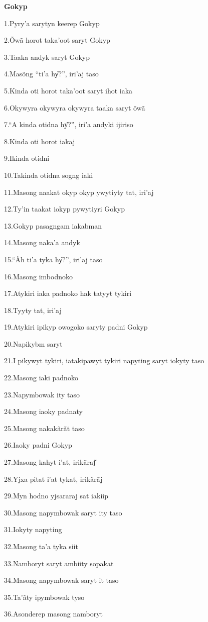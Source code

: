 \textbf{Gokyp}

1.Pyry'a sarytyn keerep Gokyp

2.Õwã horot taka'oot saryt Gokyp

3.Taaka andyk saryt Gokyp

4.Masõng ``ti'a hy͂?'', iri'aj taso

5.Kinda oti horot taka'oot saryt ihot iaka

6.Okywyra okywyra okywyra taaka saryt õwã

7.``A kinda otidna hy͂?'', iri'a andyki ijiriso

8.Kinda oti horot iakaj

9.Ikinda otidni

10.Takinda otidna sogng iaki

11.Masong naakat okyp okyp ywytiyty tat, iri'aj

12.Ty'in taakat iokyp pywytiyri Gokyp

13.Gokyp pasagngam iakabman

14.Masong naka'a andyk

15.``Ãh ti'a tyka hy͂?'', iri'aj taso

16.Masong imbodnoko

17.Atykiri iaka padnoko hak tatyyt tykiri

18.Tyyty tat, iri'aj

19.Atykiri ipikyp owogoko saryty padni Gokyp

20.Napikybm saryt

21.I pikywyt tykiri, iatakipawyt tykiri napyting saryt iokyty taso

22.Masong iaki padnoko

23.Napymbowak ity taso

24.Masong iaoky padnaty

25.Masong nakakãrãt taso

26.Iaoky padni Gokyp

27.Masong kahyt i'at, irikãraj͂

28.Yjxa pitat i'at tykat, irikãrãj

29.Myn hodno yjsararaj sat iakiip

30.Masong napymbowak saryt ity taso

31.Iokyty napyting

32.Masong ta'a tyka siit

33.Namboryt saryt ambiity sopakat

34.Masong napymbowak saryt it taso

35.Ta'ãty ipymbowak tyso

36.Asonderep masong namboryt

